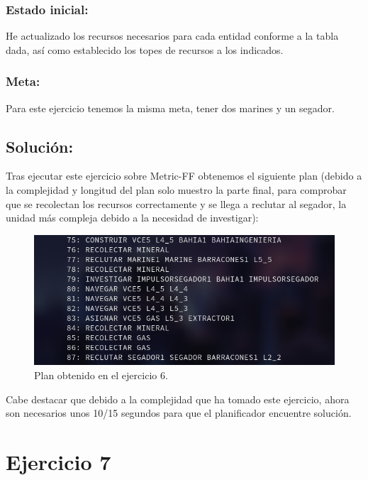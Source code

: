 \documentclass[10pt, spanish]{article}
\begin{document}
\subsubsection{Estado inicial:}

He actualizado los recursos necesarios para cada entidad conforme a la tabla dada, así como establecido los topes de recursos a los indicados.

\subsubsection{Meta:}

Para este ejercicio tenemos la misma meta, tener dos marines y un segador.

\subsection{Solución:}

\begin{multicols}{2}

Tras ejecutar este ejercicio sobre Metric-FF obtenemos el siguiente plan (debido a la complejidad y longitud del plan solo muestro la parte final, para comprobar que se recolectan los recursos correctamente y se llega a reclutar al segador, la unidad más compleja debido a la necesidad de investigar): 

\begin{figure}[H]
	\centering
	\vspace*{-1cm}\includegraphics[scale=0.3]{plan6.png}
	\caption{Plan obtenido en el ejercicio 6.}
	\label{plan6}
\end{figure}

\end{multicols}
Cabe destacar que debido a la complejidad que ha tomado este ejercicio, ahora son necesarios unos 10/15 segundos para que el planificador encuentre solución.


\section{Ejercicio 7}
\end{document}
